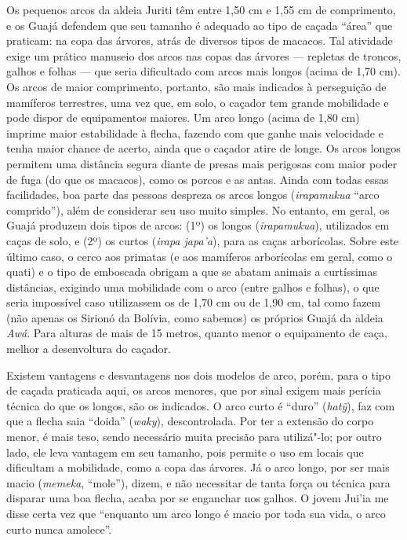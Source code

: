 Os pequenos arcos da aldeia Juriti têm entre 1,50 cm e 1,55 cm de
comprimento, e os Guajá defendem que seu tamanho é adequado ao tipo de
caçada ``área'' que praticam: na copa das árvores, atrás de diversos
tipos de macacos. Tal atividade exige um prático manuseio dos arcos nas
copas das árvores --- repletas de troncos, galhos e folhas --- que seria
dificultado com arcos mais longos (acima de 1,70 cm). Os arcos de maior
comprimento, portanto, são mais indicados à perseguição de mamíferos
terrestres, uma vez que, em solo, o caçador tem grande mobilidade e pode
dispor de equipamentos maiores. Um arco longo (acima de 1,80 cm) imprime
maior estabilidade à flecha, fazendo com que ganhe mais velocidade e
tenha maior chance de acerto, ainda que o caçador atire de longe. Os
arcos longos permitem uma distância segura diante de presas mais
perigosas com maior poder de fuga (do que os macacos), como os porcos e
as antas. Ainda com todas essas facilidades, boa parte das pessoas
despreza os arcos longos (\emph{irapamukua} ``arco comprido''), além de
considerar seu uso muito simples. No entanto, em geral, os Guajá
produzem dois tipos de arcos: (1º) os longos (\emph{irapamukua}),
utilizados em caças de solo, e (2º) os curtos (\emph{irapa japa'a}),
para as caças arborícolas. Sobre este último caso, o cerco aos primatas
(e aos mamíferos arborícolas em geral, como o quati) e o tipo de
emboscada obrigam a que se abatam animais a curtíssimas distâncias,
exigindo uma mobilidade com o arco (entre galhos e folhas), o que seria
impossível caso utilizassem os de 1,70 cm ou de 1,90 cm, tal como fazem
(não apenas os Sirionó da Bolívia, como sabemos) os próprios Guajá da
aldeia \emph{Awá}. Para alturas de mais de 15 metros, quanto menor o
equipamento de caça, melhor a desenvoltura do caçador.

Existem vantagens e desvantagens nos dois modelos de arco, porém, para o
tipo de caçada praticada aqui, os arcos menores, que por sinal exigem
mais perícia técnica do que os longos, são os indicados. O arco curto é
``duro'' (\emph{hatỹ}), faz com que a flecha saia ``doida'' (\emph{waky}),
descontrolada. Por ter a extensão do corpo menor, é mais teso, sendo
necessário muita precisão para utilizá"-lo; por outro lado, ele leva
vantagem em seu tamanho, pois permite o uso em locais que dificultam a
mobilidade, como a copa das árvores. Já o arco longo, por ser mais macio
(\emph{memeka}, ``mole''), dizem, e não necessitar de tanta força ou
técnica para disparar uma boa flecha, acaba por se enganchar nos galhos.
O jovem Jui'ia me disse certa vez que ``enquanto um arco longo é macio
por toda sua vida, o arco curto nunca amolece''.

